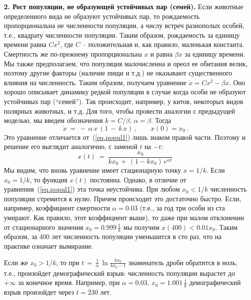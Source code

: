 \documentclass[12pt,a4paper]{article}
\begin{document}
\textbf{2. Рост популяции, не образующей устойчивых пар (семей).} Если
животные определенного вида не образуют устойчивых пар, то
рождаемость пропорциональна не численности популяции, а числу встреч разнополых
особей, т.е., квадрату численности популяции. Таким образом, рождаемость за единицу времени равна $Cx^2$,
где $C$ -- положительная и, как правило, маленькая константа. Смертность же по-прежнему пропорциональна $x$ и
равна $\beta x$ за единицу времени.
Мы также предполагаем, что
популяция малочисленна и ореол ее обитания велик, поэтому другие факторы (наличие пищи и т.д.)
  не оказывают существенного влияния на численность.
Таким образом, получаем уравнение $\dot x = Cx^2 - \beta x$. Оно хорошо описывает динамику редкой популяции в случае когда особи не образуют устойчивых пар (``семей''). Так происходит, например, у китов, некоторых видов полярных животных, и т.д.
 Для того, чтобы провести аналогии с предыдущей моделью, мы
введем обозначения $k = C/\beta, \, \alpha = \beta$. Тогда
\begin{equation}\label{eq.popul3}
\dot x \ = \ - \, \alpha \, x\, (1 \, - \, k\, x)\, , \qquad x(0) = x_0\, .
\end{equation}
Это уравнение отличается от~(\ref{eq.popul1}) лишь знаком правой части. Поэтому и решение его выглядит аналогично,
с заменой $t$ на $-t$:
\begin{equation}\label{eq.sol-popul3}
x(t)\ = \ \frac{x_0}{kx_0 \, + \, (1-kx_0)\, e^{\alpha t}}\,
\end{equation}
Мы видим, что вновь уравнение имеет стационарную точку $x = 1/k$. Если $x_0 = 1/k$, то
функция $x(t)$ постоянна. Однако, в отличие от уравнения~(\ref{eq.popul1}) эта точка неустойчива.
При любом $x_0 < 1/k$ численность популяции стремится к нулю. Причем происходит это достаточно быстро.
Если, например, коэффициент смертности $\alpha = 0.03$ (т.е., за год три особи из ста умирают. Как правило, этот  коэффициент выше), то даже при
малом отклонении от стационарного значения $x_0 = 0.999\, \frac1k$ мы получим
$x(400) < 0.01 x_0$. Таким образом, за 400 лет численность популяции уменьшится в сто раз,
что на практике означает вымирание.

Если же $x_0 > 1/k$, то при $t \, = \, \frac{1}{\alpha}\, \ln \frac{kx_0}{kx_0 - 1}$
знаменатель дроби обратится в ноль, т.е., произойдет демографический взрыв: численность популяции вырастет до $+\infty$ за конечное время. Например, при $\alpha = 0.03, \,  x_0 = 1.001\, \frac1k$ демографический взрыв произойдет через
$t = 230$ лет.
\smallskip
\end{document}

